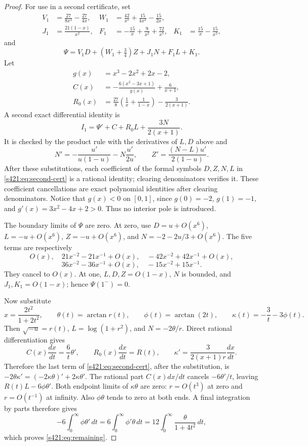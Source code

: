 \documentclass[11pt,a4paper]{article}
\theoremstyle{remark}\newtheorem{remark}[theorem]{Remark}
\numberwithin{equation}{section}
\begin{document}
\begin{proof}
For use in a second certificate, set
\begin{align*}
 V_1&=\frac{27}{8x^2}-\frac{27}{4x},&
 W_1&=\frac{42}{x^5}+\frac{15}{4x^2}-\frac{15}{2x},\\
 J_1&=\frac{21(1-x)}{x^2},&
 F_1&=-\frac{15}{x}+\frac9{x^2}+\frac{72}{x^5},&
 K_1&=\frac{15}{x}-\frac{15}{x^2},
\end{align*}
and
\[
 \Psi=V_1D+(W_1+\tfrac34)Z+J_1N+F_1L+K_1.
\]
Let
\begin{align*}
 g(x)&=x^3-2x^2+2x-2,\\
 C(x)&=-\frac{6(x^2-3x+1)}{g(x)}+\frac6{x+1},\\
 R_0(x)&=\frac{27}{8}\left(\frac1x+\frac1{1-x}\right)-\frac3{2(x+1)}.
\end{align*}
A second exact differential identity is
\begin{equation}\label{s421:eq:second-cert}
 I_1=\Psi'+C+R_0L+\frac{3N}{2(x+1)}.
\end{equation}
It is checked by the product rule with the derivatives of $L,D$ above and
\[
 N'=-\frac{u'}{u(1-u)}-N\frac{u'}{2u},\qquad
 Z'=\frac{(N-L)u'}{2(1-u)}.
\]
After these substitutions, each coefficient of the formal symbols $D,Z,N,L$ in \eqref{s421:eq:second-cert} is a rational identity; clearing denominators verifies it. These coefficient cancellations are exact polynomial identities after clearing denominators. Notice that $g(x)<0$ on $[0,1]$, since $g(0)=-2$, $g(1)=-1$, and $g'(x)=3x^2-4x+2>0$. Thus no interior pole is introduced.

The boundary limits of $\Psi$ are zero. At zero, use
$D=u+O(x^6)$, $L=-u+O(x^6)$, $Z=-u+O(x^6)$, and
$N=-2-2u/3+O(x^6)$. The five terms are respectively
\[
 O(x),\quad 21x^{-2}-21x^{-1}+O(x),\quad
 -42x^{-2}+42x^{-1}+O(x),
\]
\[
 36x^{-2}-36x^{-1}+O(x),\quad
 -15x^{-2}+15x^{-1}.
\]
They cancel to $O(x)$. At one, $L,D,Z=O(1-x)$, $N$ is bounded, and $J_1,K_1=O(1-x)$; hence $\Psi(1^-)=0$.

Now substitute
\begin{equation}\label{s421:eq:substitution}
 x=\frac{2t^2}{1+2t^2},\qquad
 \theta(t)=\arctan r(t),\qquad\phi(t)=\arctan(2t),\qquad
 \kappa(t)=-\frac3t-3\phi(t).
\end{equation}
Then $\sqrt{-u}=r(t)$, $L=\log(1+r^2)$, and $N=-2\theta/r$. Direct rational differentiation gives
\begin{equation}\label{s421:eq:sub-checks}
 C(x)\frac{dx}{dt}=\frac6t\theta',\qquad
 R_0(x)\frac{dx}{dt}=R(t),\qquad
 \kappa'=\frac{3}{2(x+1)r}\frac{dx}{dt}.
\end{equation}
Therefore the last term of \eqref{s421:eq:second-cert}, after the substitution, is
$-2\theta\kappa'=(-2\kappa\theta)'+2\kappa\theta'$.
The rational part $C(x)dx/dt$ cancels $-6\theta'/t$, leaving
$R(t)L-6\phi\theta'$. Both endpoint limits of $\kappa\theta$ are zero:
$r=O(t^3)$ at zero and $r=O(t^{-1})$ at infinity. Also $\phi\theta$ tends to zero at both ends. A final integration by parts therefore gives
\[
 -6\int_0^\infty\phi\theta'\,dt
 =6\int_0^\infty\phi'\theta\,dt
 =12\int_0^\infty\frac{\theta}{1+4t^2}\,dt,
\]
which proves \eqref{s421:eq:remaining}.


\end{proof}
\end{document}
